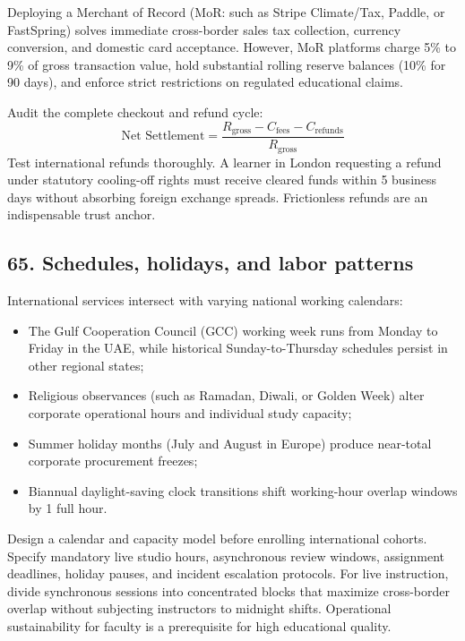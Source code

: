 Deploying a Merchant of Record (MoR: such as Stripe Climate/Tax, Paddle, or FastSpring) solves immediate cross-border sales tax collection, currency conversion, and domestic card acceptance. However, MoR platforms charge 5\% to 9\% of gross transaction value, hold substantial rolling reserve balances (10\% for 90 days), and enforce strict restrictions on regulated educational claims.

Audit the complete checkout and refund cycle:
\begin{equation}
\text{Net Settlement} = \frac{R_{\text{gross}} - C_{\text{fees}} - C_{\text{refunds}}}{R_{\text{gross}}}
\end{equation}
Test international refunds thoroughly. A learner in London requesting a refund under statutory cooling-off rights must receive cleared funds within 5 business days without absorbing foreign exchange spreads. Frictionless refunds are an indispensable trust anchor.

\subsection{65. Schedules, holidays, and labor patterns}

International services intersect with varying national working calendars:
\begin{itemize}
    \item The Gulf Cooperation Council (GCC) working week runs from Monday to Friday in the UAE, while historical Sunday-to-Thursday schedules persist in other regional states;
    \item Religious observances (such as Ramadan, Diwali, or Golden Week) alter corporate operational hours and individual study capacity;
    \item Summer holiday months (July and August in Europe) produce near-total corporate procurement freezes;
    \item Biannual daylight-saving clock transitions shift working-hour overlap windows by 1 full hour.
\end{itemize}

Design a calendar and capacity model before enrolling international cohorts. Specify mandatory live studio hours, asynchronous review windows, assignment deadlines, holiday pauses, and incident escalation protocols. For live instruction, divide synchronous sessions into concentrated blocks that maximize cross-border overlap without subjecting instructors to midnight shifts. Operational sustainability for faculty is a prerequisite for high educational quality.

